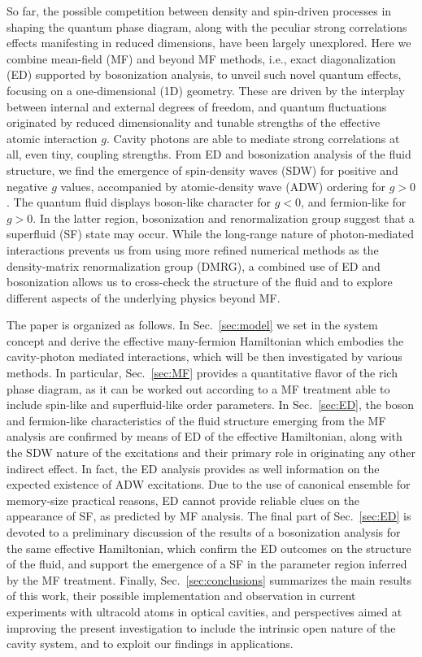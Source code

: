 \documentclass[pra,aps,superscriptaddress,twocolumn]{revtex4}
\begin{document}
So far, the possible competition between density and spin-driven processes in shaping the quantum phase diagram,
along with the peculiar strong correlations effects manifesting in reduced dimensions,
have been largely unexplored.
Here we combine mean-field (MF) and beyond MF methods, i.e., exact diagonalization (ED)
supported by bosonization analysis, to unveil such novel quantum effects, focusing on a one-dimensional (1D) geometry.
These are driven by the interplay between internal and external degrees of freedom, and quantum fluctuations
originated by reduced dimensionality and tunable strengths of the effective atomic interaction $g$.
Cavity photons are able to mediate strong correlations at all, even tiny, coupling strengths.
From ED and bosonization analysis of the fluid structure,
we find the emergence of spin-density waves (SDW) for positive and negative $g$ values,
accompanied by atomic-density wave (ADW) ordering for $g>0$. The quantum fluid displays boson-like character for $g<0$,
and fermion-like for $g>0$. In the latter region, bosonization and renormalization group
suggest that a superfluid (SF) state may occur. While the long-range nature of photon-mediated interactions
prevents us from using more refined numerical methods as the density-matrix renormalization group (DMRG),
a combined use of ED and bosonization allows us to cross-check the structure of the fluid and to explore different
aspects of the underlying physics beyond MF.

The paper is organized as follows. In Sec.~\ref{sec:model} we set in the system concept and derive the effective many-fermion Hamiltonian which embodies the
cavity-photon mediated interactions, which will be then investigated by various methods. In particular, Sec.~\ref{sec:MF} provides a quantitative flavor of the
rich phase diagram, as it can be worked out according to a MF treatment able to include spin-like and superfluid-like order parameters. In Sec.~\ref{sec:ED}, the
boson and fermion-like characteristics of the fluid structure emerging from the MF analysis are confirmed by means of ED of the effective
Hamiltonian, along with the SDW nature of the excitations and their primary role in originating any other indirect effect. In fact, the ED
analysis provides as well information on the expected existence of ADW excitations. Due to the use of canonical ensemble for memory-size practical
reasons, ED cannot provide reliable clues on the appearance of SF, as predicted by MF analysis. The final part of Sec.~\ref{sec:ED}
is devoted to a preliminary discussion of the results of a bosonization analysis for the same effective Hamiltonian, which confirm the ED
outcomes on the structure of the fluid,
and support the emergence of a SF in the parameter region inferred by the MF treatment. Finally, Sec.~\ref{sec:conclusions} summarizes the main
results of this work, their possible implementation and observation in current experiments with ultracold atoms in optical cavities,
and perspectives aimed at improving the
present investigation to include the intrinsic open nature of the cavity system, and to exploit our findings in applications.
\end{document}
